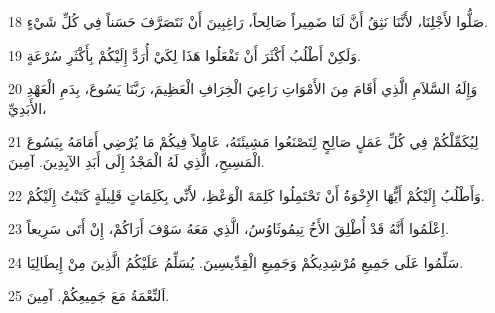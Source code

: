 \par 18 صَلُّوا لأَجْلِنَا، لأَنَّنَا نَثِقُ أَنَّ لَنَا ضَمِيراً صَالِحاً، رَاغِبِينَ أَنْ نَتَصَرَّفَ حَسَناً فِي كُلِّ شَيْءٍ.
\par 19 وَلَكِنْ أَطْلُبُ أَكْثَرَ أَنْ تَفْعَلُوا هَذَا لِكَيْ أُرَدَّ إِلَيْكُمْ بِأَكْثَرِ سُرْعَةٍ.
\par 20 وَإِلَهُ السَّلاَمِ الَّذِي أَقَامَ مِنَ الأَمْوَاتِ رَاعِيَ الْخِرَافِ الْعَظِيمَ، رَبَّنَا يَسُوعَ، بِدَمِ الْعَهْدِ الأَبَدِيِّ،
\par 21 لِيُكَمِّلْكُمْ فِي كُلِّ عَمَلٍ صَالِحٍ لِتَصْنَعُوا مَشِيئَتَهُ، عَامِلاً فِيكُمْ مَا يُرْضِي أَمَامَهُ بِيَسُوعَ الْمَسِيحِ، الَّذِي لَهُ الْمَجْدُ إِلَى أَبَدِ الآبِدِينَ. آمِينَ.
\par 22 وَأَطْلُبُ إِلَيْكُمْ أَيُّهَا الإِخْوَةُ أَنْ تَحْتَمِلُوا كَلِمَةَ الْوَعْظِ، لأَنِّي بِكَلِمَاتٍ قَلِيلَةٍ كَتَبْتُ إِلَيْكُمْ.
\par 23 اِعْلَمُوا أَنَّهُ قَدْ أُطْلِقَ الأَخُ تِيمُوثَاوُسُ، الَّذِي مَعَهُ سَوْفَ أَرَاكُمْ، إِنْ أَتَى سَرِيعاً.
\par 24 سَلِّمُوا عَلَى جَمِيعِ مُرْشِدِيكُمْ وَجَمِيعِ الْقِدِّيسِينَ. يُسَلِّمُ عَلَيْكُمُ الَّذِينَ مِنْ إِيطَالِيَا.
\par 25 اَلنِّعْمَةُ مَعَ جَمِيعِكُمْ. آمِينَ.


